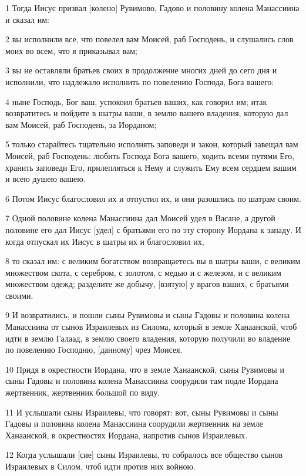\par 1 Тогда Иисус призвал [колено] Рувимово, Гадово и половину колена Манассиина и сказал им:
\par 2 вы исполнили все, что повелел вам Моисей, раб Господень, и слушались слов моих во всем, что я приказывал вам;
\par 3 вы не оставляли братьев своих в продолжение многих дней до сего дня и исполнили, что надлежало исполнить по повелению Господа, Бога вашего:
\par 4 ныне Господь, Бог ваш, успокоил братьев ваших, как говорил им; итак возвратитесь и пойдите в шатры ваши, в землю вашего владения, которую дал вам Моисей, раб Господень, за Иорданом;
\par 5 только старайтесь тщательно исполнять заповеди и закон, который завещал вам Моисей, раб Господень: любить Господа Бога вашего, ходить всеми путями Его, хранить заповеди Его, прилепляться к Нему и служить Ему всем сердцем вашим и всею душею вашею.
\par 6 Потом Иисус благословил их и отпустил их, и они разошлись по шатрам своим.
\par 7 Одной половине колена Манассиина дал Моисей удел в Васане, а другой половине его дал Иисус [удел] с братьями его по эту сторону Иордана к западу. И когда отпускал их Иисус в шатры их и благословил их,
\par 8 то сказал им: с великим богатством возвращаетесь вы в шатры ваши, с великим множеством скота, с серебром, с золотом, с медью и с железом, и с великим множеством одежд; разделите же добычу, [взятую] у врагов ваших, с братьями своими.
\par 9 И возвратились, и пошли сыны Рувимовы и сыны Гадовы и половина колена Манассиина от сынов Израилевых из Силома, который в земле Ханаанской, чтоб идти в землю Галаад, в землю своего владения, которую получили во владение по повелению Господню, [данному] чрез Моисея.
\par 10 Придя в окрестности Иордана, что в земле Ханаанской, сыны Рувимовы и сыны Гадовы и половина колена Манассиина соорудили там подле Иордана жертвенник, жертвенник большой по виду.
\par 11 И услышали сыны Израилевы, что говорят: вот, сыны Рувимовы и сыны Гадовы и половина колена Манассиина соорудили жертвенник на земле Ханаанской, в окрестностях Иордана, напротив сынов Израилевых.
\par 12 Когда услышали [сие] сыны Израилевы, то собралось все общество сынов Израилевых в Силом, чтоб идти против них войною.
